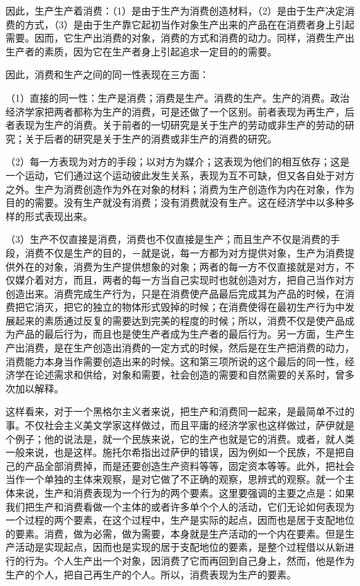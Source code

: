 \documentclass[a4paper,twoside,12pt]{ctexart}
\begin{document}
因此，生产生产着消费：（1）是由于生产为消费创造材料，（2）是由于生产决定消费的方式，（3）是由于生产靠它起初当作对象生产出来的产品在在消费者身上引起需要。因而，它生产出消费的对象，消费的方式和消费的动力。同样，消费生产出生产者的素质，因为它在生产者身上引起追求一定目的的需要。

因此，消费和生产之间的同一性表现在三方面：

（1）直接的同一性：生产是消费；消费是生产。消费的生产。生产的消费。政治经济学家把两者都称为生产的消费，可是还做了一个区别。前者表现为再生产，后者表现为生产的消费。关于前者的一切研究是关于生产的劳动或非生产的劳动的研究；关于后者的研究是关于生产的消费或非生产的消费的研究。

（2）每一方表现为对方的手段；以对方为媒介；这表现为他们的相互依存；这是一个运动，它们通过这个运动彼此发生关系，表现为互不可缺，但又各自处于对方之外。生产为消费创造作为外在对象的材料；消费为生产创造作为内在对象，作为目的的需要。没有生产就没有消费；没有消费就没有生产。这在经济学中以多种多样的形式表现出来。

（3）生产不仅直接是消费，消费也不仅直接是生产；而且生产不仅是消费的手段，消费不仅是生产的目的，－就是说，每一方都为对方提供对象，生产为消费提供外在的对象，消费为生产提供想象的对象；两者的每一方不仅直接就是对方，不仅媒介着对方，而且，两者的每一方当自己实现时也就创造对方，把自己当作对方创造出来。消费完成生产行为，只是在消费使产品最后完成其为产品的时候，在消费把它消灭，把它的独立的物体形式毁掉的时候；在消费使得在最初生产行为中发展起来的素质通过反复的需要达到完美的程度的时候；所以，消费不仅是使产品成为产品的最后行为，而且也是使生产者成为生产者的最后行为。另一方面，生产生产出消费，是在生产创造出消费的一定方式的时候，然后是在生产把消费的动力，消费能力本身当作需要创造出来的时候。这和第三项所说的这个最后的同一性，经济学在论述需求和供给，对象和需要，社会创造的需要和自然需要的关系时，曾多次加以解释。

这样看来，对于一个黑格尔主义者来说，把生产和消费同一起来，是最简单不过的事。不仅社会主义美文学家这样做过，而且平庸的经济学家也这样做过，萨伊就是个例子；他的说法是，就一个民族来说，它的生产也就是它的消费。或者，就人类一般来说，也是这样。施托尔希指出过萨伊的错误，因为例如一个民族，不是把自己的产品全部消费掉，而是还要创造生产资料等等，固定资本等等。此外，把社会当作一个单独的主体来观察，是对它做了不正确的观察，思辨式的观察。就一个主体来说，生产和消费表现为一个行为的两个要素。这里要强调的主要之点是：如果我们把生产和消费看做一个主体的或者许多单个个人的活动，它们无论如何表现为一个过程的两个要素，在这个过程中，生产是实际的起点，因而也是居于支配地位的要素。消费，做为必需，做为需要，本身就是生产活动的一个内在要素。但是生产活动是实现起点，因而也是实现的居于支配地位的要素，是整个过程借以从新进行的行为。个人生产出一个对象，因消费了它而再回到自己身上，然而，他是作为生产的个人，把自己再生产的个人。所以，消费表现为生产的要素。
\end{document}
